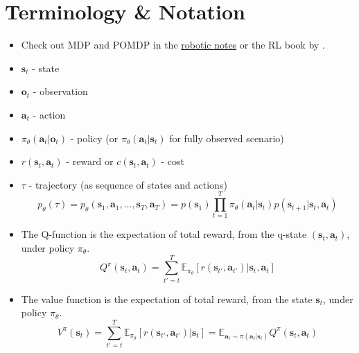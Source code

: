 \section{Terminology \& Notation}
\begin{itemize}
	\item Check out \ac{MDP} and \ac{POMDP} in the \href{robotics.pdf}{robotic notes} or the \ac{RL} book by .
	\item $\textbf{s}_t$ - state
	\item $\textbf{o}_t$ - observation
	\item $\textbf{a}_t$ - action
	\item $\pi_{\theta}(\textbf{a}_t | \textbf{o}_t)$ - policy (or $\pi_{\theta}(\textbf{a}_t | \textbf{s}_t)$ for fully observed scenario)
	\item $r(\textbf{s}_t, \textbf{a}_t)$ - reward or $c(\textbf{s}_t, \textbf{a}_t)$ - cost
	\item $\tau$ - trajectory (as sequence of states and actions)
	\[ p_\theta(\tau) = p_\theta(\textbf{s}_1, \textbf{a}_1, \dots, \textbf{s}_T, \textbf{a}_T) = p(\textbf{s}_1) \prod_{t=1}^{T} \pi_\theta(\textbf{a}_t | \textbf{s}_t) p(\textbf{s}_{t+1} | \textbf{s}_t, \textbf{a}_t) \]
	\item The Q-function is the expectation of total reward, from the q-state $(\textbf{s}_t, \textbf{a}_t)$, under policy $\pi_\theta$.
	\begin{equation}
		Q^\pi (\textbf{s}_t, \textbf{a}_t) = \sum_{t' = t}^{T} \mathbb{E}_{\pi_\theta} \left[ r(\textbf{s}_{t'}, \textbf{a}_{t'}) | \textbf{s}_t, \textbf{a}_t \right]
	\end{equation}
	\item The value function is the expectation of total reward, from the state $\textbf{s}_t$, under policy $\pi_\theta$.
	\begin{equation}
		V^\pi (\textbf{s}_t) = \sum_{t' = t}^{T} \mathbb{E}_{\pi_\theta} \left[ r(\textbf{s}_{t'}, \textbf{a}_{t'}) | \textbf{s}_t \right] = \mathbb{E}_{\textbf{a}_t \sim \pi(\textbf{a}_t | \textbf{s}_t)} Q^\pi (\textbf{s}_t, \textbf{a}_t)
	\end{equation}
\end{itemize}

